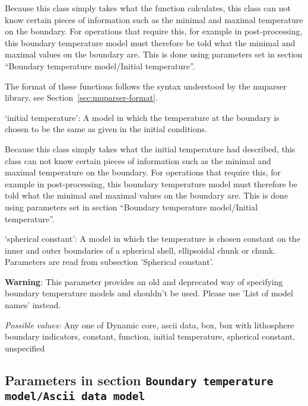 \begin{itemize}
Because this class simply takes what the function calculates, this class can not know certain pieces of information such as the minimal and maximal temperature on the boundary. For operations that require this, for example in post-processing, this boundary temperature model must therefore be told what the minimal and maximal values on the boundary are. This is done using parameters set in section ``Boundary temperature model/Initial temperature''.

The format of these functions follows the syntax understood by the muparser library, see Section~\ref{sec:muparser-format}.

`initial temperature': A model in which the temperature at the boundary is chosen to be the same as given in the initial conditions.

Because this class simply takes what the initial temperature had described, this class can not know certain pieces of information such as the minimal and maximal temperature on the boundary. For operations that require this, for example in post-processing, this boundary temperature model must therefore be told what the minimal and maximal values on the boundary are. This is done using parameters set in section ``Boundary temperature model/Initial temperature''.

`spherical constant': A model in which the temperature is chosen constant on the inner and outer boundaries of a spherical shell, ellipsoidal chunk or chunk. Parameters are read from subsection 'Spherical constant'.

\textbf{Warning}: This parameter provides an old and deprecated way of specifying boundary temperature models and shouldn't be used. Please use 'List of model names' instead.


{\it Possible values:} Any one of Dynamic core, ascii data, box, box with lithosphere boundary indicators, constant, function, initial temperature, spherical constant, unspecified
\end{itemize}



\subsection{Parameters in section \tt Boundary temperature model/Ascii data model}
\label{parameters:Boundary_20temperature_20model/Ascii_20data_20model}

